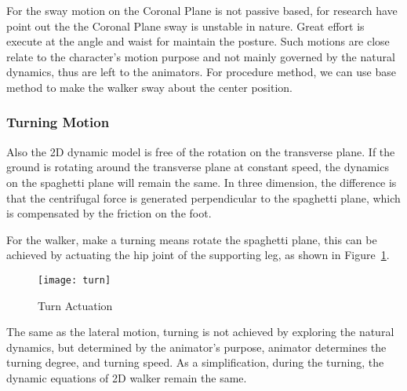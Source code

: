 {For the sway motion on the Coronal Plane is not passive based, for research have point out the the Coronal Plane sway is unstable in nature\citep{kuo1999stabilization}.
Great effort is execute at the angle and waist for maintain the posture.
Such motions are close relate to the character's motion purpose and not mainly governed by the natural dynamics, thus are left to the animators.
For procedure method, we can use \pd base method to make the walker sway about the center position.


\subsubsection*{Turning Motion}
Also the 2D dynamic model is free of the rotation on the transverse plane.
If the ground is rotating around the transverse plane at constant speed, the dynamics on the spaghetti plane will remain the same.
In three dimension, the difference is that the centrifugal force is generated perpendicular to the spaghetti plane, which is  compensated by the friction on the foot.

For the walker,  make a turning means rotate the spaghetti plane, this can be achieved by actuating the  hip joint of the supporting leg, as shown in Figure~\ref{fig:turn}.


\begin{figure}[!htbp]
  \begin{center}
      \texttt{[image: turn]}
    \caption{Turn Actuation}
    \label{fig:turn}
\end{center}
\end{figure}


The same as the lateral motion, turning is not achieved by exploring the natural dynamics, but determined by the animator's purpose, animator determines the turning degree, and turning speed.
As a simplification, during the turning, the dynamic equations of 2D walker remain the same.





}
